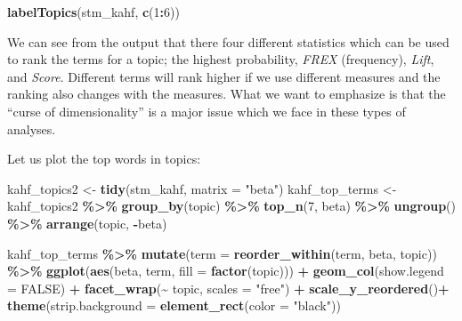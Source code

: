 \documentclass[
]{article}
\newenvironment{Shaded}{\begin{snugshade}}{\end{snugshade}}
\newcommand{\AttributeTok}[1]{\textcolor[rgb]{0.13,0.29,0.53}{#1}}
\newcommand{\ConstantTok}[1]{\textcolor[rgb]{0.56,0.35,0.01}{#1}}
\newcommand{\DecValTok}[1]{\textcolor[rgb]{0.00,0.00,0.81}{#1}}
\newcommand{\FunctionTok}[1]{\textcolor[rgb]{0.13,0.29,0.53}{\textbf{#1}}}
\newcommand{\NormalTok}[1]{#1}
\newcommand{\OtherTok}[1]{\textcolor[rgb]{0.56,0.35,0.01}{#1}}
\newcommand{\SpecialCharTok}[1]{\textcolor[rgb]{0.81,0.36,0.00}{\textbf{#1}}}
\newcommand{\StringTok}[1]{\textcolor[rgb]{0.31,0.60,0.02}{#1}}
\begin{document}
\scriptsize

\begin{Shaded}
\begin{Highlighting}[]
\FunctionTok{labelTopics}\NormalTok{(stm\_kahf, }\FunctionTok{c}\NormalTok{(}\DecValTok{1}\SpecialCharTok{:}\DecValTok{6}\NormalTok{))}
\end{Highlighting}
\end{Shaded}

\normalsize

We can see from the output that there four different statistics which can be used to rank the terms for a topic; the highest probability, \emph{FREX} (frequency), \emph{Lift}, and \emph{Score}. Different terms will rank higher if we use different measures and the ranking also changes with the measures. What we want to emphasize is that the ``curse of dimensionality'' is a major issue which we face in these types of analyses.

Let us plot the top words in topics:

\begin{Shaded}
\begin{Highlighting}[]
\NormalTok{kahf\_topics2 }\OtherTok{\textless{}{-}} \FunctionTok{tidy}\NormalTok{(stm\_kahf, }\AttributeTok{matrix =} \StringTok{"beta"}\NormalTok{)}
\NormalTok{kahf\_top\_terms }\OtherTok{\textless{}{-}}\NormalTok{ kahf\_topics2 }\SpecialCharTok{\%\textgreater{}\%}
  \FunctionTok{group\_by}\NormalTok{(topic) }\SpecialCharTok{\%\textgreater{}\%}
  \FunctionTok{top\_n}\NormalTok{(}\DecValTok{7}\NormalTok{, beta) }\SpecialCharTok{\%\textgreater{}\%}
  \FunctionTok{ungroup}\NormalTok{() }\SpecialCharTok{\%\textgreater{}\%}
  \FunctionTok{arrange}\NormalTok{(topic, }\SpecialCharTok{{-}}\NormalTok{beta)}

\NormalTok{kahf\_top\_terms }\SpecialCharTok{\%\textgreater{}\%}
  \FunctionTok{mutate}\NormalTok{(}\AttributeTok{term =} \FunctionTok{reorder\_within}\NormalTok{(term, beta, topic)) }\SpecialCharTok{\%\textgreater{}\%}
  \FunctionTok{ggplot}\NormalTok{(}\FunctionTok{aes}\NormalTok{(beta, term, }\AttributeTok{fill =} \FunctionTok{factor}\NormalTok{(topic))) }\SpecialCharTok{+}
  \FunctionTok{geom\_col}\NormalTok{(}\AttributeTok{show.legend =} \ConstantTok{FALSE}\NormalTok{) }\SpecialCharTok{+}
  \FunctionTok{facet\_wrap}\NormalTok{(}\SpecialCharTok{\textasciitilde{}}\NormalTok{ topic, }\AttributeTok{scales =} \StringTok{"free"}\NormalTok{) }\SpecialCharTok{+}
  \FunctionTok{scale\_y\_reordered}\NormalTok{()}\SpecialCharTok{+}
  \FunctionTok{theme}\NormalTok{(}\AttributeTok{strip.background =} \FunctionTok{element\_rect}\NormalTok{(}\AttributeTok{color =} \StringTok{"black"}\NormalTok{))}
\end{Highlighting}
\end{Shaded}
\end{document}
